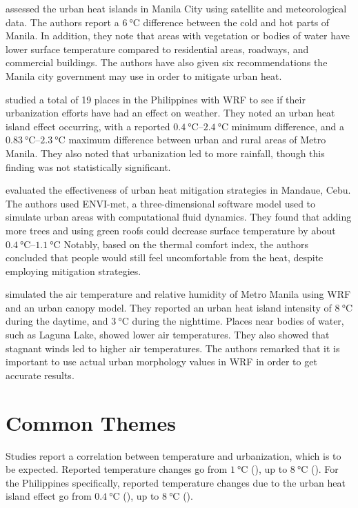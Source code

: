 		\textcite{Purio2022} assessed the urban heat islands in Manila City using satellite and meteorological data.
		The authors report a $\qty{6}{\degreeCelsius}$ difference between the cold and hot parts of Manila.
		In addition, they note that areas with vegetation or bodies of water have lower surface temperature compared to residential areas, roadways, and commercial buildings.
		The authors have also given six recommendations the Manila city government may use in order to mitigate urban heat.
		
		\textcite{Oliveros2019} studied a total of 19 places in the Philippines with WRF to see if their urbanization efforts have had an effect on weather.
		They noted an urban heat island effect occurring, with a reported
			$\qtyrange{0.4}{2.4}{\degreeCelsius}$ minimum difference, and a 
			$\qtyrange{0.83}{2.3}{\degreeCelsius}$ maximum difference
			between urban and rural areas of Metro Manila.
		They also noted that urbanization led to more rainfall, though this finding was not statistically significant.
		
		\textcite{Cortes2022} evaluated the effectiveness of urban heat mitigation strategies in Mandaue, Cebu.
		The authors used ENVI-met, a three-dimensional software model used to simulate urban areas with computational fluid dynamics.
		They found that adding more trees and using green roofs could decrease surface temperature by about $\qtyrange{0.4}{1.1}{\degreeCelsius}$
		Notably, based on the thermal comfort index, the authors concluded that people would still feel uncomfortable from the heat, despite employing mitigation strategies.
		
		\textcite{Bilang2022} simulated the air temperature and relative humidity of Metro Manila using WRF and an urban canopy model.
		They reported an urban heat island intensity of $\qty{8}{\degreeCelsius}$ during the daytime, and
			$\qty{3}{\degreeCelsius}$ during the nighttime.
		Places near bodies of water, such as Laguna Lake, showed lower air temperatures.
		They also showed that stagnant winds led to higher air temperatures.
		The authors remarked that it is important to use actual urban morphology values in WRF in order to get accurate results.
		

\section{Common Themes}
	Studies report a correlation between temperature and urbanization, which is to be expected.
	Reported temperature changes go from $\qty{1}{\degreeCelsius}$ (\cite{Huszar2018a}), 
		up to $\qty{8}{\degreeCelsius}$ (\cite{Wang2019}).
	For the Philippines specifically, reported temperature changes due to the urban heat island effect go from $\qty{0.4}{\degreeCelsius}$ (\cite{Oliveros2019}),
		up to $\qty{8}{\degreeCelsius}$ (\cite{Bilang2022}).
	
